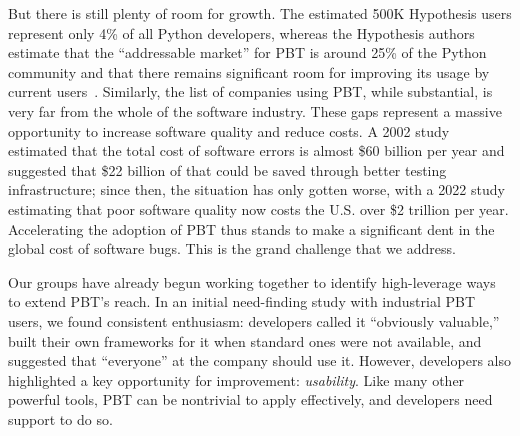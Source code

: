 But there is still plenty of room
for growth.
The estimated  500K
Hypothesis users represent only 4\% of all Python developers, whereas
the Hypothesis
authors estimate that the ``addressable market'' for PBT is around
25\% of the Python
community and that there remains significant room for
improving its usage by current users~\cite{ZacPersonalCommunication,noauthor_python_nodate}.
Similarly, the list of
companies using PBT, while substantial, is very far from the whole of the software
industry.
These gaps represent a massive opportunity to increase software quality
and reduce costs.
A 2002 study~\cite{2002economic} estimated that the total cost of software errors is almost
\$60 billion per year and suggested that \$22 billion of that could be
saved through
better testing infrastructure; since then, the situation has only gotten worse, with a 2022
study~\cite{krasner2022cost} estimating that poor software quality now
costs the U.S.{} over \$2 trillion per
year. Accelerating the adoption of PBT thus stands to make a
significant dent
in the global cost of software bugs.  This is the grand challenge that
we address.

 

Our groups have already begun working together to identify
high-leverage ways to extend PBT's reach.
In an initial need-finding study with industrial PBT users, we found consistent enthusiasm:
developers called it
``obviously valuable,'' built their own
frameworks for it when standard ones were not available, and suggested that ``everyone''
at the company should use it.  However, developers
also highlighted a key opportunity for improvement: {\em usability}.
%
Like
many other powerful tools, PBT can be nontrivial to apply effectively, and developers
need support to do so.

